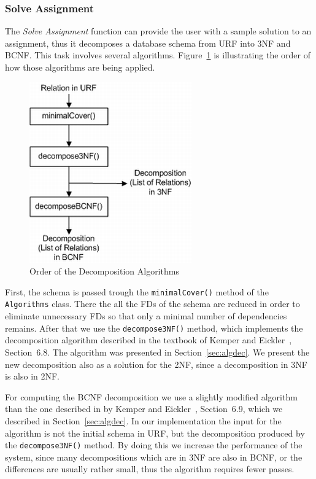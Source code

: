 \subsubsection{Solve Assignment}  
The \textit{Solve Assignment} function can provide the user with a sample solution
to an assignment, thus it decomposes a database schema from URF into 3NF and BCNF. This
task involves several algorithms. Figure~\ref{fig:orderdecomposition} is 
illustrating the order of how those algorithms are being applied.

\begin{figure}[h]
	\begin{center}
		\includegraphics[scale=0.6]{./img/decomposition1a.png}
		\caption{Order of the Decomposition Algorithms}
		\label{fig:orderdecomposition}
	\end{center}
\end{figure}

First, the schema is passed trough the
\verb=minimalCover()= method of the \verb=Algorithms= class. There the all the
FDs of the schema are reduced in order to eliminate unnecessary FDs so that only 
a minimal number of dependencies remains. After that we use the \verb=decompose3NF()=
method, which implements the decomposition algorithm described in the textbook of 
Kemper and Eickler~\cite{bdb2}, Section~6.8. The algorithm was presented in Section~\ref{sec:algdec}.
We  present the new decomposition also as a solution for the 2NF, since
a decomposition in 3NF is also in 2NF. 

For computing the BCNF decomposition we use a slightly modified algorithm than the one described
in by Kemper and Eickler~\cite{bdb2}, Section~6.9, which we described in Section~\ref{sec:algdec}. In our implementation
the input for the algorithm is not the initial schema in URF, but the decomposition
produced by the \verb=decompose3NF()= method. By doing this we 
increase the performance of the system, since many decompositions which 
are in 3NF are also in BCNF, or the differences are usually rather small, thus the algorithm
requires fewer passes.   
  
